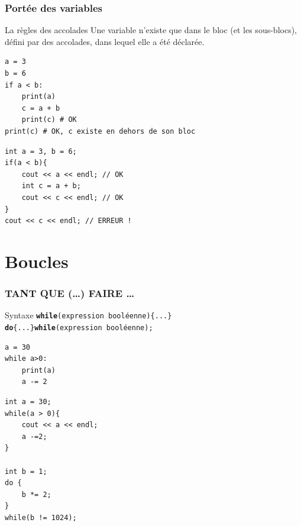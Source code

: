 \begin{frame}[fragile]
	\frametitle{Portée des variables}
	\begin{block}{La règles des accolades}
		Une variable n'existe que dans le bloc (et les sous-blocs), défini par des accolades, dans lequel elle a été déclarée.
	\end{block}

	\begin{minipage}{0.45\linewidth}
		\begin{verbatim}
a = 3
b = 6
if a < b:
    print(a)
    c = a + b
    print(c) # OK
print(c) # OK, c existe en dehors de son bloc
		\end{verbatim}
	\end{minipage}
	\hfill
	\begin{minipage}{0.50\linewidth}
		\begin{verbatim}
int a = 3, b = 6;
if(a < b){
    cout << a << endl; // OK
    int c = a + b;
    cout << c << endl; // OK
}
cout << c << endl; // ERREUR !
		\end{verbatim}
	\end{minipage}
\end{frame}

\section{Boucles}

\begin{frame}[fragile]
	\frametitle{TANT QUE (\dots) FAIRE \dots}

    \begin{block}{Syntaxe}
        \texttt{\textbf{while}(expression booléenne)\{...\}}\\
        \texttt{\textbf{do}\{...\}\textbf{while}(expression booléenne);}
    \end{block}

    \begin{minipage}{0.47\linewidth}
        \begin{verbatim}
a = 30
while a>0:
    print(a)
    a -= 2

        \end{verbatim}
    \end{minipage}
    \hfill
    \begin{minipage}{0.47\linewidth}
        \begin{verbatim}
int a = 30;
while(a > 0){
    cout << a << endl;
    a -=2;
}

int b = 1;
do {
    b *= 2;
}
while(b != 1024);

        \end{verbatim}
    \end{minipage}
\end{frame}

